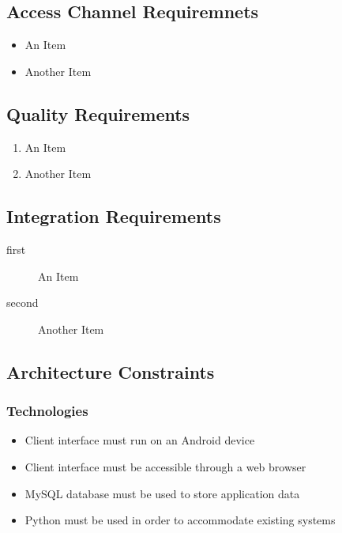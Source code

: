 \documentclass[a4paper]{article}
\begin{document}
		\subsection{Access Channel Requiremnets}

			\begin{itemize}

				\item{An Item}

				\item{Another Item}

			\end{itemize}

		\subsection{Quality Requirements}

			\begin{enumerate}

				\item{An Item}

				\item{Another Item}

			\end{enumerate}

		\subsection{Integration Requirements}

			\begin{description}

				\item[first]{An Item}

				\item[second]{Another Item}

			\end{description}

		\subsection{Architecture Constraints}
		
			\subsubsection{Technologies}
		
				\begin{itemize}

					\item{Client interface must run on an Android device}

					\item{Client interface must be accessible through a web browser}
					
					\item{MySQL database must be used to store application data}
					
					\item{Python must be used in order to accommodate existing systems}

				\end{itemize}
				
\end{document}
